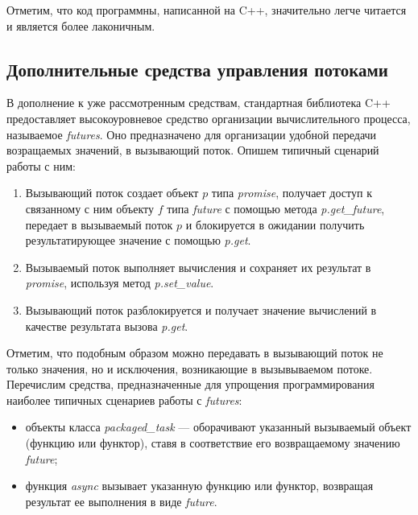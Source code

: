 Отметим, что код программны, написанной на C++,
значительно легче читается и является более лаконичным.

\subsection{Дополнительные средства управления потоками}

В дополнение к уже рассмотренным средствам, стандартная библиотека
C++ предоставляет высокоуровневое средство организации
вычислительного процесса, называемое \textit{futures}.
Оно предназначено для организации удобной передачи возращаемых значений,
в вызывающий поток.
Опишем типичный сценарий работы с ним:
\begin{enumerate}
\item Вызывающий поток создает объект \( p \) типа \textit{promise},
  получает доступ к связанному с ним объекту  \( f \) типа \textit{future}
  с помощью метода \textit{p.get\_future},
  передает в вызываемый поток \( p \) и блокируется в ожидании получить
  результатирующее значение с помощью \textit{p.get}.
\item Вызываемый поток выполняет вычисления и сохраняет их результат
  в \textit{promise}, используя метод \textit{p.set\_value}.
\item Вызывающий поток разблокируется и получает значение вычислений
  в качестве результата вызова \textit{p.get}.
\end{enumerate}

Отметим, что подобным образом можно передавать в вызывающий поток
не только значения, но и исключения, возникающие в вызывываемом потоке.
Перечислим средства, предназначенные для упрощения программирования
наиболее типичных сценариев работы с \textit{futures}:
\begin{itemize}
\item объекты класса \textit{packaged\_task} --- оборачивают указанный
  вызываемый объект (функцию или функтор), ставя в соответствие
  его возвращаемому значению \textit{future};
\item функция \textit{async} вызывает указанную функцию или функтор,
  возвращая результат ее выполнения в виде \textit{future}.
\end{itemize}
